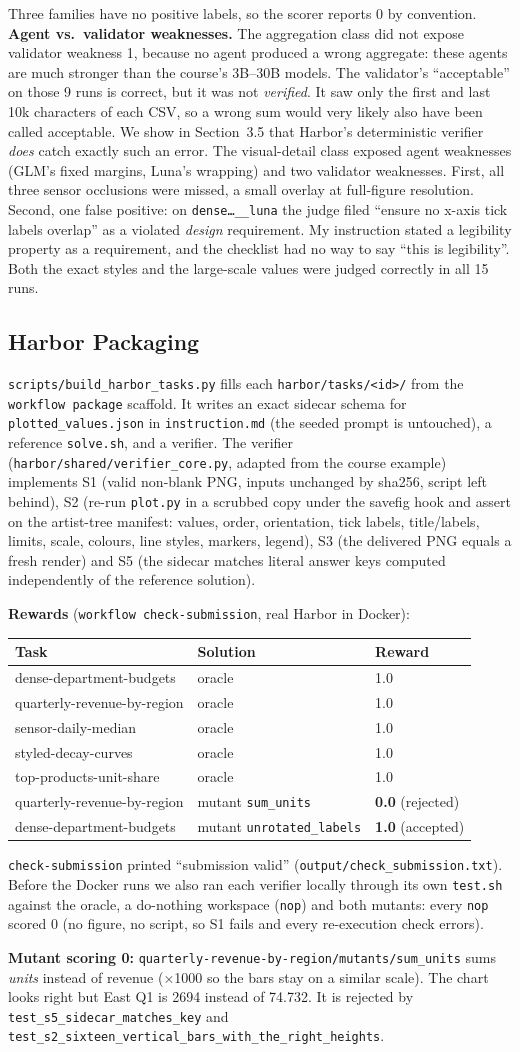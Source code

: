 \documentclass[11pt]{article}
\newcommand{\run}[1]{\texttt{#1}}
\newcommand{\HARBORRESULTS}{\begin{center}\small\begin{tabular}{lll}\toprule Task & Solution & Reward \\ \midrule dense-department-budgets & oracle & 1.0 \\ quarterly-revenue-by-region & oracle & 1.0 \\ sensor-daily-median & oracle & 1.0 \\ styled-decay-curves & oracle & 1.0 \\ top-products-unit-share & oracle & 1.0 \\ \midrule quarterly-revenue-by-region & mutant \texttt{sum\_units} & \textbf{0.0} (rejected) \\ dense-department-budgets & mutant \texttt{unrotated\_labels} & \textbf{1.0} (accepted) \\ \bottomrule\end{tabular}\end{center} \texttt{check-submission} printed ``submission valid'' (\texttt{output/check\_submission.txt}). Before the Docker runs we also ran each verifier locally through its own \texttt{test.sh} against the oracle, a do-nothing workspace (\texttt{nop}) and both mutants: every \texttt{nop} scored 0 (no figure, no script, so S1 fails and every re-execution check errors).}
\begin{document}
Three families have no positive labels, so the scorer reports 0 by convention.
\textbf{Agent vs.\ validator weaknesses.} The aggregation class did not expose
validator weakness 1, because no agent produced a wrong aggregate: these agents
are much stronger than the course's 3B--30B models. The validator's
``acceptable'' on those 9 runs is correct, but it was not \emph{verified}. It
saw only the first and last 10k characters of each CSV, so a wrong sum would
very likely also have been called acceptable. We show in Section~3.5 that
Harbor's deterministic verifier \emph{does} catch exactly such an error. The
visual-detail class exposed agent weaknesses (GLM's fixed margins, Luna's
wrapping) and two validator weaknesses. First, all three sensor occlusions
were missed, a small overlay at full-figure resolution. Second, one false
positive: on \run{dense\ldots\_\_luna} the judge filed ``ensure no x-axis tick
labels overlap'' as a violated \emph{design} requirement. My instruction stated
a legibility property as a requirement, and the checklist had no way to say
``this is legibility''. Both the exact styles and the large-scale values
were judged correctly in all 15 runs.

\subsection{Harbor Packaging}
\texttt{scripts/build\_harbor\_tasks.py} fills each \texttt{harbor/tasks/<id>/} from
the \texttt{workflow package} scaffold. It writes an exact sidecar schema for
\texttt{plotted\_values.json} in \texttt{instruction.md} (the seeded prompt is
untouched), a reference \texttt{solve.sh}, and a verifier. The verifier
(\texttt{harbor/shared/verifier\_core.py}, adapted from the course example)
implements S1 (valid non-blank PNG, inputs unchanged by sha256, script left
behind), S2 (re-run \texttt{plot.py} in a scrubbed copy under the savefig hook
and assert on the artist-tree manifest: values, order, orientation, tick labels,
title/labels, limits, scale, colours, line styles, markers, legend), S3 (the
delivered PNG equals a fresh render) and S5 (the sidecar matches literal answer
keys computed independently of the reference solution).

\textbf{Rewards} (\texttt{workflow check-submission}, real Harbor in Docker):
\HARBORRESULTS

\textbf{Mutant scoring 0:}
\texttt{quarterly-revenue-by-region/mutants/sum\_units} sums \emph{units}
instead of revenue ($\times$1000 so the bars stay on a similar scale). The chart
looks right but East Q1 is 2694 instead of 74.732. It is rejected by
\texttt{test\_s5\_sidecar\_matches\_key} and
\texttt{test\_s2\_sixteen\_vertical\_bars\_with\_the\_right\_heights}.
\end{document}
